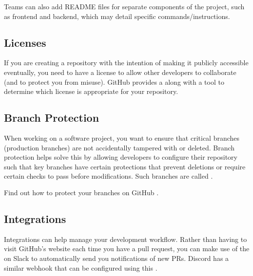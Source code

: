 \documentclass[letterpaper,10pt,english]{jupyterBook}
\begin{document}
\sphinxAtStartPar
Teams can also add README files for separate components of the project,
such as frontend and backend, which may detail specific
commands/instructions.


\subsection{Licenses}
\label{\detokenize{chapter_6/github:licenses}}
\sphinxAtStartPar
If you are creating a repository with the intention of making it
publicly accessible eventually, you need to have a license to allow
other developers to collaborate (and to protect you from misuse). GitHub
provides a
along with a tool to determine which license is appropriate for your
repository.


\subsection{Branch Protection}
\label{\detokenize{chapter_6/github:branch-protection}}
\sphinxAtStartPar
When working on a software project, you want to ensure that critical
branches (production branches) are not accidentally tampered with or
deleted. Branch protection helps solve this by allowing developers to
configure their repository such that key branches have certain
protections that prevent deletions or require certain checks to pass
before modifications. Such branches are called .

\sphinxAtStartPar
Find out how to protect your branches on GitHub
.


\subsection{Integrations}
\label{\detokenize{chapter_6/github:integrations}}
\sphinxAtStartPar
Integrations can help manage your development workflow. \sphinxhyphen{} Rather than
having to visit GitHub’s website each time you have a pull request, you
can make use of the
on Slack to automatically send you notifications of new PRs. Discord
has a similar webhook that can be configured using this
.
\end{document}
